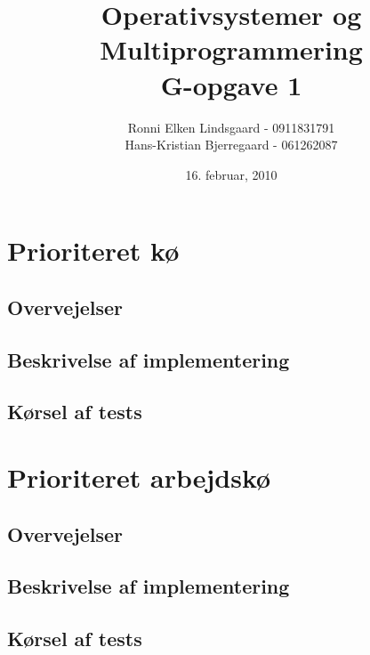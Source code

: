 \documentclass{article}
\title{Operativsystemer og Multiprogrammering\\G-opgave 1}
\author{Ronni Elken Lindsgaard - 0911831791 \\
Hans-Kristian Bjerregaard - 061262087}
\date{16. februar, 2010}
\begin{document}
\maketitle
\newpage
\section{Prioriteret kø}
\subsection{Overvejelser}
\subsection{Beskrivelse af implementering}
\subsection{Kørsel af tests}
\section{Prioriteret arbejdskø}
\subsection{Overvejelser}
\subsection{Beskrivelse af implementering}
\subsection{Kørsel af tests}
\end{document}
